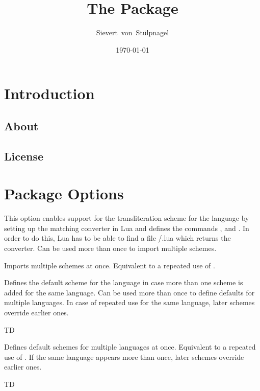 \documentclass{ltxdockit}
\title{The \sty{transconv} Package}
\author{Sievert\ von\ St\"{u}lpnagel}
\date{\today}
\begin{document}
\maketitle

\tableofcontents
\listoftables

\section{Introduction}\label{int}

\subsection[About]{About }

\subsection{License}

\section{Package Options}

\begin{optionlist}

  This option enables support for the transliteration scheme  for
  the language  by setting up the matching converter in Lua and
  defines the commands ,
   and
  . In order to do this, Lua has to be able
  to find a file /.lua which returns the converter. Can
  be used more than once to import multiple schemes.


  Imports multiple schemes at once. Equivalent to a repeated use of
  .


  Defines the default scheme for the language  in case more than one
  scheme is added for the same language. Can be used more than once to define
  defaults for multiple languages. In case of repeated use for the same
  language, later schemes override earlier ones.

  TD


  Defines default schemes for multiple languages at once. Equivalent to a
  repeated use of . If the same language appears more than
  once, later schemes override earlier ones.

  TD

\end{optionlist}
\end{document}
